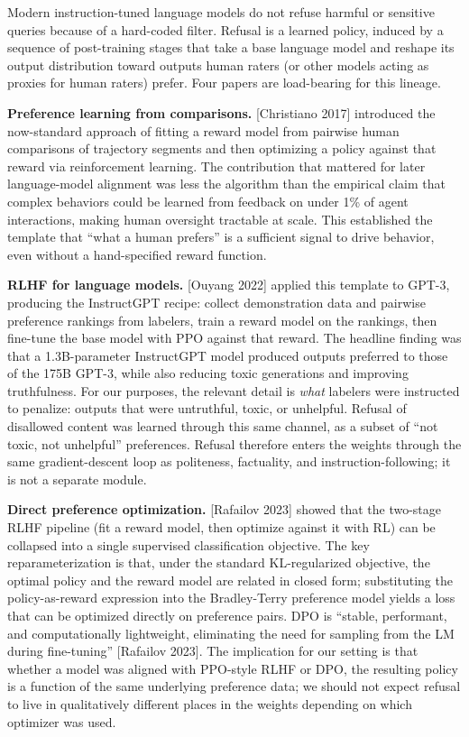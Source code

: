 \documentclass[
  11pt,
]{article}
\begin{document}
Modern instruction-tuned language models do not refuse harmful or
sensitive queries because of a hard-coded filter. Refusal is a learned
policy, induced by a sequence of post-training stages that take a base
language model and reshape its output distribution toward outputs human
raters (or other models acting as proxies for human raters) prefer. Four
papers are load-bearing for this lineage.

\textbf{Preference learning from comparisons.} {[}Christiano 2017{]}
introduced the now-standard approach of fitting a reward model from
pairwise human comparisons of trajectory segments and then optimizing a
policy against that reward via reinforcement learning. The contribution
that mattered for later language-model alignment was less the algorithm
than the empirical claim that complex behaviors could be learned from
feedback on under 1\% of agent interactions, making human oversight
tractable at scale. This established the template that ``what a human
prefers'' is a sufficient signal to drive behavior, even without a
hand-specified reward function.

\textbf{RLHF for language models.} {[}Ouyang 2022{]} applied this
template to GPT-3, producing the InstructGPT recipe: collect
demonstration data and pairwise preference rankings from labelers, train
a reward model on the rankings, then fine-tune the base model with PPO
against that reward. The headline finding was that a 1.3B-parameter
InstructGPT model produced outputs preferred to those of the 175B GPT-3,
while also reducing toxic generations and improving truthfulness. For
our purposes, the relevant detail is \emph{what} labelers were
instructed to penalize: outputs that were untruthful, toxic, or
unhelpful. Refusal of disallowed content was learned through this same
channel, as a subset of ``not toxic, not unhelpful'' preferences.
Refusal therefore enters the weights through the same gradient-descent
loop as politeness, factuality, and instruction-following; it is not a
separate module.

\textbf{Direct preference optimization.} {[}Rafailov 2023{]} showed that
the two-stage RLHF pipeline (fit a reward model, then optimize against
it with RL) can be collapsed into a single supervised classification
objective. The key reparameterization is that, under the standard
KL-regularized objective, the optimal policy and the reward model are
related in closed form; substituting the policy-as-reward expression
into the Bradley-Terry preference model yields a loss that can be
optimized directly on preference pairs. DPO is ``stable, performant, and
computationally lightweight, eliminating the need for sampling from the
LM during fine-tuning'' {[}Rafailov 2023{]}. The implication for our
setting is that whether a model was aligned with PPO-style RLHF or DPO,
the resulting policy is a function of the same underlying preference
data; we should not expect refusal to live in qualitatively different
places in the weights depending on which optimizer was used.
\end{document}
